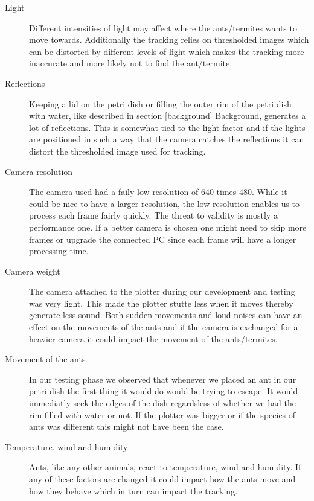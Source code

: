 \begin{description}
\item[Light] Different intensities of light may affect where the ants/termites wants to move towards. Additionally the tracking relies on thresholded images which can be distorted by different levels of light which makes the tracking more inaccurate and more likely not to find the ant/termite. \\

\item[Reflections] Keeping a lid on the petri dish or filling the outer rim of the petri dish with water, like described in section \ref{background} Background, generates a lot of reflections. This is somewhat tied to the light factor and if the lights are positioned in such a way that the camera catches the reflections it can distort the thresholded image used for tracking. \\

\item[Camera resolution] The camera used had a faily low resolution of 640 times 480. While it could be nice to have a larger resolution, the low resolution enables us to process each frame fairly quickly. The threat to validity is mostly a performance one. If a better camera is chosen one might need to skip more frames or upgrade the connected PC since each frame will have a longer processing time. \\

\item[Camera weight] The camera attached to the plotter during our development and testing was very light. This made the plotter stutte less when it moves thereby generate less sound. Both sudden movements and loud noises can have an effect on the movements of the ants and if the camera is exchanged for a heavier camera it could impact the movement of the ants/termites. \\

\item[Movement of the ants] In our testing phase we observed that whenever we placed an ant in our petri dish the first thing it would do would be trying to escape. It would immediatly seek the edges of the dish regardsless of whether we had the rim filled with water or not. If the plotter was bigger or if the species of ants was different this might not have been the case. \\

\item[Temperature, wind and humidity] Ants, like any other animals, react to temperature, wind and humidity. If any of these factors are changed it could impact how the ants move and how they behave which in turn can impact the tracking. \\  


\end{description}
